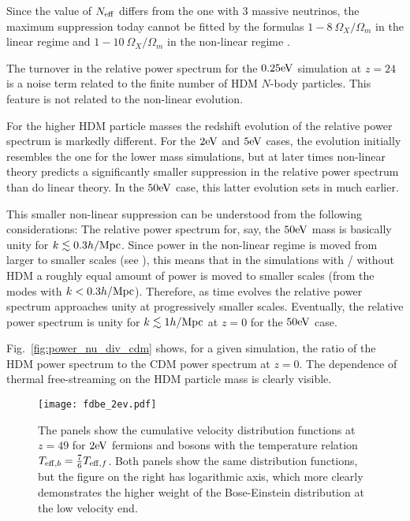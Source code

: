 \documentclass[11pt,a4paper]{article}
\renewcommand\({\left(}
\renewcommand\){\right)}
\renewcommand\[{\left[}
\renewcommand\]{\right]}
\begin{document}
Since the value of $N_{\rm eff}$ differs from the one with 3 massive neutrinos, the maximum suppression today cannot be fitted by the formulas $1-8~\Omega_X / \Omega_m$ in the linear regime and $1-10~\Omega_X / \Omega_m$ in the non-linear regime \cite{Brandbyge:2008rv}.

The turnover in the relative power spectrum for the $0.25 {\rm eV}$ simulation at $z=24$ is a noise term related to the finite number of HDM $N$-body particles. This feature is not related to the non-linear evolution.

For the higher HDM particle masses the redshift evolution of the relative power spectrum is markedly different. For the $2{\rm eV}$ and $5{\rm eV}$ cases, the evolution initially resembles the one for the lower mass simulations, but at later times non-linear theory predicts a significantly smaller suppression in the relative power spectrum than do linear theory. In the $50{\rm eV}$ case, this latter evolution sets in much earlier.

This smaller non-linear suppression can be understood from the following considerations: The relative power spectrum for, say, the $50{\rm eV}$ mass is basically unity for $k\lesssim 0.3 h/{\rm Mpc}$. Since power in the non-linear regime is moved from larger to smaller scales (see \cite{Brandbyge:2017wyw}), this means that in the simulations with / without HDM a roughly equal amount of power is moved to smaller scales (from the modes with $k<0.3 h/{\rm Mpc}$). Therefore, as time evolves the relative power spectrum approaches unity at progressively smaller scales. Eventually, the relative power spectrum is unity for $k\lesssim 1 h/{\rm Mpc}$ at $z=0$ for the $50{\rm eV}$ case.

Fig.~\ref{fig:power_nu_div_cdm} shows, for a given simulation, the ratio of the HDM power spectrum to the CDM power spectrum at $z=0$. The dependence of thermal free-streaming on the HDM particle mass is clearly visible. 

 \begin{figure}[t]
  \vspace*{-7.5cm}
\begin{center}
\hspace*{-1.0cm}
\texttt{[image: fdbe\_2ev.pdf]}
\end{center}
 \vspace*{-7.0cm}
\caption{The panels show the cumulative velocity distribution functions at $z=49$ for $2{\rm eV}$ fermions and bosons with the temperature relation $T_{{\rm eff},b} = \frac{7}{6} T_{{\rm eff},f}$. Both panels show the same distribution functions, but the figure on the right has logarithmic axis, which more clearly demonstrates the higher weight of the Bose-Einstein distribution at the low velocity end.}
   \label{fig:velocity_dist2}
\end{figure}
\end{document}
